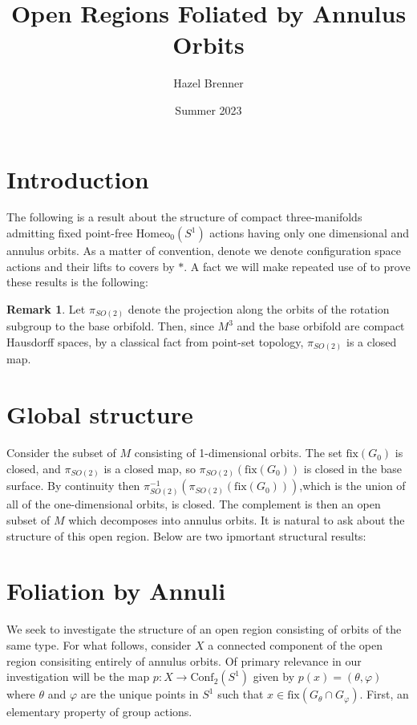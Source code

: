 \documentclass[10pt, oneside]{article}
\title{Open Regions Foliated by Annulus Orbits}
\author{Hazel Brenner}
\date{Summer 2023}
\newcommand{\homeoS}{\text{Homeo}_0(S^1)}
\theoremstyle{definition}
\newtheorem{rem}{Remark}[section]
\theoremstyle{definition}
\begin{document}
\maketitle

\section{Introduction}
The following is a result about the structure of compact three-manifolds admitting fixed point-free $\homeoS$ actions having only one dimensional and annulus orbits. As a matter of convention, denote we denote configuration space actions and their lifts to covers by $*$. A fact we will make repeated use of to prove these results is the following:

\begin{rem}
    Let $\pi_{SO(2)}$ denote the projection along the orbits of the rotation subgroup to the base orbifold. Then, since $M^3$ and the base orbifold are compact Hausdorff spaces, by a classical fact from point-set topology, $\pi_{SO(2)}$ is a closed map.
\end{rem}

\section{Global structure}
Consider the subset of $M$ consisting of 1-dimensional orbits. The set $\text{fix}(G_0)$ is closed, and $\pi_{SO(2)}$ is a closed map, so $\pi_{SO(2)}(\text{fix}(G_0))$ is closed in the base surface. By continuity then $\pi_{SO(2)}^{-1}(\pi_{SO(2)}(\text{fix}(G_0)))$,which is the union of all of the one-dimensional orbits, is closed.
The complement is then an open subset of $M$ which decomposes into annulus orbits. It is natural to ask about the structure of this open region. Below are two ipmortant structural results:

\section{Foliation by Annuli}

We seek to investigate the structure of an open region consisting of orbits of the same type. For what follows, consider $X$ a connected component of the open region consisiting entirely of annulus orbits. Of primary relevance in our investigation will be the map $p: X\to \text{Conf}_2(S^1)$ given by $p(x) = (\theta, \varphi)$ where $\theta$ and $\varphi$ are the unique points in $S^1$ such that $x\in\text{fix}(G_\theta\cap G_\varphi)$. First, an elementary property of group actions.
\end{document}
